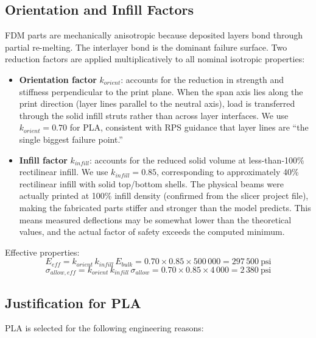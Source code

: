 \documentclass[11pt,letterpaper]{article}
\begin{document}
\subsection{Orientation and Infill Factors}

FDM parts are mechanically anisotropic because deposited layers bond through
partial re-melting.  The interlayer bond is the dominant failure surface.
Two reduction factors are applied multiplicatively to all nominal isotropic
properties:

\begin{itemize}[noitemsep]
  \item \textbf{Orientation factor} $k_{orient}$: accounts for the reduction
    in strength and stiffness perpendicular to the print plane.  When the span
    axis lies along the print direction (layer lines parallel to the neutral
    axis), load is transferred through the solid infill struts rather than
    across layer interfaces.  We use $k_{orient} = 0.70$ for PLA, consistent
    with RPS guidance that layer lines are ``the single biggest failure point.''
  \item \textbf{Infill factor} $k_{infill}$: accounts for the reduced
    solid volume at less-than-100\% rectilinear infill.  We use
    $k_{infill} = 0.85$, corresponding to approximately 40\% rectilinear
    infill with solid top/bottom shells.  The physical beams were actually
    printed at 100\% infill density (confirmed from the slicer project file),
    making the fabricated parts stiffer and stronger than the model predicts.
    This means measured deflections may be somewhat lower than the theoretical
    values, and the actual factor of safety exceeds the computed minimum.
\end{itemize}

Effective properties:
\[
  E_{eff} = k_{orient}\,k_{infill}\,E_{bulk}
  = 0.70 \times 0.85 \times 500\,000 = 297\,500\ \mathrm{psi}
\]
\[
  \sigma_{allow,eff} = k_{orient}\,k_{infill}\,\sigma_{allow}
  = 0.70 \times 0.85 \times 4\,000 = 2\,380\ \mathrm{psi}
\]

\subsection{Justification for PLA}

PLA is selected for the following engineering reasons:
\end{document}

